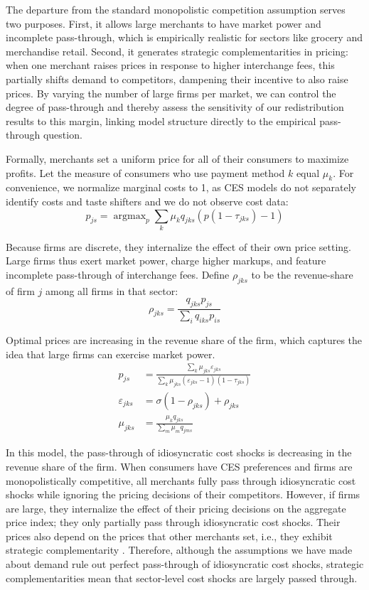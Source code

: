 \documentclass[11pt,english]{article}
\theoremstyle{remark}
\newcommand{\argmax}[0]{\operatorname{argmax}}
\begin{document}
The departure from the standard monopolistic competition assumption serves two purposes.
First, it allows large merchants to have market power and incomplete pass-through, which is empirically realistic for sectors like grocery and merchandise retail.
Second, it generates strategic complementarities in pricing: when one merchant raises prices in response to higher interchange fees, this partially shifts demand to competitors, dampening their incentive to also raise prices.
By varying the number of large firms per market, we can control the degree of pass-through and thereby assess the sensitivity of our redistribution results to this margin, linking model structure directly to the empirical pass-through question.

Formally, merchants set a uniform price for all of their consumers to maximize profits.
Let the measure of consumers who use payment method $k$ equal $\mu_k$.
For convenience, we normalize marginal costs to 1, as CES models do not separately identify costs and taste shifters and we do not observe cost data:
\[
p_{js}=\argmax_{p}\sum_{k}\mu_k q_{jks}\left(p\left(1-\tau_{jks}\right)-1\right)
\]

Because firms are discrete, they internalize the effect of their own price setting.
Large firms thus exert market power, charge higher markups, and feature incomplete pass-through of interchange fees.
Define $\rho_{jks}$ to be the revenue-share of firm $j$ among all firms in that sector:
\[
\rho_{jks} =\frac{q_{jks}p_{js}}{\sum_{i}q_{iks}p_{is}}
\]

Optimal prices are increasing in the revenue share of the firm, which captures the idea that large firms can exercise market power. 
\begin{align}
  
p_{js} & = \frac{\sum_{k}\mu_{jks}\varepsilon_{jks}}{\sum_{k}\mu_{jks}\left(\varepsilon_{jks}-1\right)\left(1-\tau_{jks}\right)} \\
  \varepsilon_{jks} & = \sigma(1-\rho_{jks}) + \rho_{jks} \\
\mu_{jks} & =\frac{\mu_k q_{jks}}{\sum_{m}\mu_m q_{jms}}
\end{align}

In this model, the pass-through of idiosyncratic cost shocks is decreasing in the revenue share of the firm. When consumers have CES preferences and firms are monopolistically competitive, all merchants fully pass through idiosyncratic cost shocks while ignoring the pricing decisions of their competitors. However, if firms are large, they internalize the effect of their pricing decisions on the aggregate price index; they only partially pass through idiosyncratic cost shocks. Their prices also depend on the prices that other merchants set, i.e., they exhibit strategic complementarity \citep{Amiti.etal2019}. Therefore, although the assumptions we have made about demand rule out perfect pass-through of idiosyncratic cost shocks, strategic complementarities mean that sector-level cost shocks are largely passed through.
\end{document}
